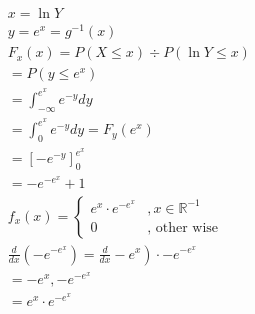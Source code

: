 \documentclass[]{article}
\begin{document}
\begin{math}
\begin{aligned}
&x=\ln Y\\
&y=e^x=g^{-1}(x)\\
&F_x(x)=P(X \leq x) \div P(\ln Y \leq x)\\
&=P\left(y \leq e^x\right)\\
&=\int_{-\infty}^{e^x} e^{-y} d y\\
&=\int_0^{e^x} e^{-y} d y=F_y\left(e^x\right)\\
&=\left[-e^{-y}\right]_0^{e^x}\\
&=-e^{-e^x}+1\\
&f_x(x)=\left\{\begin{array}{cl}
e^x \cdot e^{-e^x} & , x \in \mathbb{R}^{-1} \\
0 & \text {, other wise }
\end{array}\right.\\
&\left.\frac{d}{d x}\left(-e^{-e^x}\right)=\frac{d}{d x}-e^x\right) \cdot-e^{-e^x}\\
&=-e^x,-e^{-e^x}\\
&=e^x \cdot e^{-e^x}
\end{aligned}
\end{math}
\end{document}
